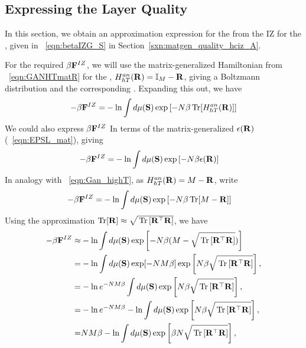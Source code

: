 \subsection{Expressing the Layer Quality}
\label{sxn:quality}

In this section, we obtain an approximation expression for the \LayerQualitySquared from the IZ \FreeEnergy for the \GeneralizationError, 
given in \EQN~\ref{eqn:betaIZG_S} in Section~\ref{sxn:matgen_quality_hciz_A}.

For the required \FreeEnergy $\beta\mathbf{F}^{IZ}$, we will use the matrix-generalized Hamiltonian
from \EQN~\ref{eqn:GANHTmatR} for the
\LayerQuality, $H^{an}_{hT}(\mathbf{R})=\mathbb{I}_{M}-\mathbf{R}$,
giving a  Boltzmann distribution and the corresponding \ThermalAverage.  
Expanding this out, we have
\begin{align}
  \label{eqn:IZFE0}
  -\beta\mathbf{F}^{IZ} =& -  \ln \int d\mu(\mathbf{S}) \exp\left[-N\beta \operatorname{Tr}[H^{an}_{hT}(\mathbf{R})]  \right] \\
\end{align}
We could also express $\beta\mathbf{F}^{IZ}$ In terms of the matrix-generalized \EffectivePotential $\epsilon(\mathbf{R})$
(\EQN~\ref{eqn:EPSL_mat}), giving
\begin{align}
  -\beta\mathbf{F}^{IZ} =& -  \ln \int d\mu(\mathbf{S}) \exp\left[-N\beta \epsilon(\mathbf{R})  \right] 
\end{align}
In analogy with \EQN~\ref{eqn:Gan_highT}, 
as $H^{an}_{hT}(\mathbf{R})=M-\mathbf{R}$,  write
\begin{align}
-\beta\mathbf{F}^{IZ}  =& -  \ln \int d\mu(\mathbf{S}) \exp\left[-N\beta \operatorname{Tr}[M-\mathbf{R}]  \right] 
\end{align}
Using the approximation $\operatorname{Tr}[\mathbf{R}]\approx\sqrt{\mbox{}\operatorname{Tr}\left[\mathbf{R}^{\top}\mathbf{R}\right]}$, we have
\begin{align}
  -\beta\mathbf{F}^{IZ} 
\approx& - \ln \int d\mu(\mathbf{S}) \exp\left[-N\beta(M-\sqrt{\mbox{}\operatorname{Tr}\left[\mathbf{R}^{\top}\mathbf{R}\right]} ) \right] \\ 
\label{eqn:IZFE1}
=& -  \ln \int d\mu(\mathbf{S}) \exp[-NM\beta]\exp\left[N\beta\sqrt{\mbox{}\operatorname{Tr}\left[\mathbf{R}^{\top}\mathbf{R}\right]}\right], \\
\label{eqn:IZFE2}
=& -  \ln e^{-NM\beta} \int d\mu(\mathbf{S}) \exp\left[N\beta\sqrt{\mbox{}\operatorname{Tr}\left[\mathbf{R}^{\top}\mathbf{R}\right]}\right], \\
\label{eqn:IZFE3}
=& -  \ln e^{-NM\beta} - \ln \int d\mu(\mathbf{S}) \exp\left[N\beta\sqrt{\mbox{}\operatorname{Tr}\left[\mathbf{R}^{\top}\mathbf{R}\right]}\right], \\
\label{eqn:IZFE4}
=& NM\beta - \ln \int d\mu(\mathbf{S}) \exp\left[\beta N\sqrt{\mbox{}\operatorname{Tr}\left[\mathbf{R}^{\top}\mathbf{R}\right]}\right], 
\end{align}

